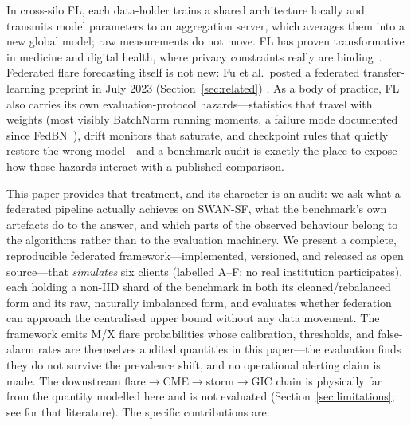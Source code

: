 In cross-silo FL, each data-holder trains a shared architecture locally
and transmits model parameters to an aggregation server, which averages
them into a new global model; raw measurements do not move. FL has
proven transformative in medicine and digital health, where privacy
constraints really are binding~\cite{rieke2020}. Federated flare
forecasting itself is not new: Fu et al.\ posted a federated
transfer-learning preprint in July 2023 (Section~\ref{sec:related})
\cite{fu2023}. As a body of practice, FL also carries its own
evaluation-protocol hazards---statistics that travel with weights
(most visibly BatchNorm running moments, a failure mode documented
since FedBN~\cite{li2021fedbn}), drift monitors that saturate, and
checkpoint rules that quietly restore the wrong model---and a benchmark
audit is exactly the place to expose how those hazards interact with a
published comparison.

This paper provides that treatment, and its character is an audit: we
ask what a federated pipeline actually achieves on SWAN-SF, what the
benchmark's own artefacts do to the answer, and which parts of the
observed behaviour belong to the algorithms rather than to the
evaluation machinery. We present a complete, reproducible federated
framework---implemented, versioned, and released as open
source---that \emph{simulates} six clients (labelled A--F; no real
institution participates), each holding a non-IID shard of the
benchmark in both its cleaned/rebalanced form and its raw, naturally
imbalanced form, and evaluates whether federation can approach the
centralised upper bound without any data movement. The framework emits
M/X flare probabilities whose calibration, thresholds, and
false-alarm rates are themselves audited quantities in this paper---the
evaluation finds they do not survive the prevalence shift, and no
operational alerting claim is made. The downstream
flare$\to$CME$\to$storm$\to$GIC chain is physically far from the
quantity modelled here and is not evaluated
(Section~\ref{sec:limitations}; see \cite{boteler2019} for that
literature). The specific contributions are:

